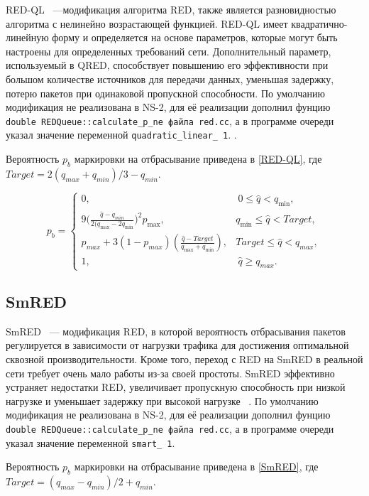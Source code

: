 RED-QL ~---модификация алгоритма RED, также является разновидностью алгоритма с нелинейно возрастающей функцией. 
RED-QL имеет квадратично-линейную форму и определяется на основе параметров, 
которые могут быть настроены для определенных требований сети\cite{REDQL}. Дополнительный параметр, 
используемый в QRED, способствует повышению его эффективности при большом количестве источников для передачи данных, уменьшая задержку,
потерю пакетов при одинаковой пропускной способности.   
По умолчанию модификация не реализована в NS-2, для её реализации дополнил фунцию 
\verb|double REDQueue::calculate_p_ne файла red.cc|, а в программе очереди указал значение переменной \verb|quadratic_linear_ 1|. . 

Вероятность $p_{b}$ маркировки на отбрасывание приведена в \eqref{RED-QL}, где $ Target = 2(q_{max} + q_{min})/3 - q_{min} $.

\begin{equation}
\label{RED-QL}
p_{b} = \begin{cases}
        0, &  \ 0 \leqslant \hat{q} < q_{\min},
        \\
        9({\frac{\hat{q} - q_{min}}{2(q_{\max} - 2q_{\min}})^2} {p_{\max}}, &  q_{\min} \leqslant  \hat{q} < {Target},
        \\
        p_{max} + 3(1-p_{max}) (\frac{\hat{q} - Target}{q_{\max} + q_{\min}}), & {Target} \leqslant  \hat{q} < q_{max},
        \\
        1, &  \ \hat{q} \geqslant q_{max}.
\end{cases}
\end{equation}


\subsection{SmRED}

SmRED ~--- модификация RED, в которой
вероятность отбрасывания пакетов регулируется в зависимости от нагрузки трафика для достижения оптимальной сквозной производительности.
Кроме того, переход с RED на SmRED в реальной сети требует очень мало работы из-за своей простоты. SmRED эффективно устраняет недостатки
RED, увеличивает пропускную способность при низкой нагрузке и уменьшает задержку при высокой нагрузке ~\cite{SmRED}. 
По умолчанию модификация не реализована в NS-2, для её реализации дополнил фунцию 
\verb|double REDQueue::calculate_p_ne файла red.cc|, а в программе очереди указал значение переменной \verb|smart_ 1|. 

Вероятность $p_{b}$ маркировки на отбрасывание приведена в \eqref{SmRED}, где $ Target = (q_{max} - q_{min})/2 + q_{min} $.

